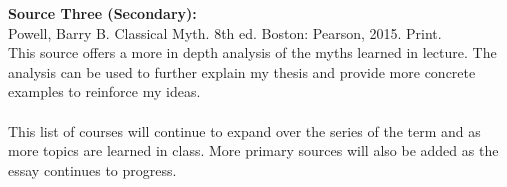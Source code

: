 \documentclass[11pt]{article}
\begin{document}
\textbf{Source Three (Secondary):}\\
Powell, Barry B. Classical Myth. 8th ed. Boston: Pearson, 2015. Print.\\

This source offers a more in depth analysis of the myths learned in lecture. 
The analysis can be used to further explain my thesis and provide more concrete
examples to reinforce my ideas.\\\\

This list of courses will continue to expand over the series of the term and as more
topics are learned in class. More primary sources will also be added as the essay continues
to progress.
\end{document}
